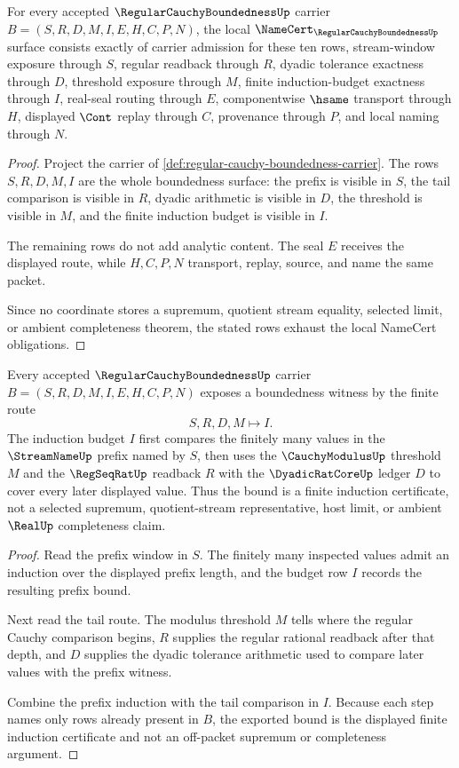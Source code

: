 \begin{theorem}
\label{thm:regular-cauchy-boundedness-namecert-obligations}
For every accepted $\RegularCauchyBoundednessUp$ carrier $B=(S,R,D,M,I,E,H,C,P,N)$, the local $\NameCert_{\RegularCauchyBoundednessUp}$ surface consists exactly of carrier admission for these ten rows, stream-window exposure through $S$, regular readback through $R$, dyadic tolerance exactness through $D$, threshold exposure through $M$, finite induction-budget exactness through $I$, real-seal routing through $E$, componentwise $\hsame$ transport through $H$, displayed $\Cont$ replay through $C$, provenance through $P$, and local naming through $N$.
\end{theorem}
\begin{proof}
Project the carrier of \autoref{def:regular-cauchy-boundedness-carrier}. The rows $S,R,D,M,I$ are the whole boundedness surface: the prefix is visible in $S$, the tail comparison is visible in $R$, dyadic arithmetic is visible in $D$, the threshold is visible in $M$, and the finite induction budget is visible in $I$.

The remaining rows do not add analytic content. The seal $E$ receives the displayed route, while $H,C,P,N$ transport, replay, source, and name the same packet.

Since no coordinate stores a supremum, quotient stream equality, selected limit, or ambient completeness theorem, the stated rows exhaust the local NameCert obligations.
\end{proof}

\begin{theorem}
\label{thm:regular-cauchy-boundedness-finite-induction-bound}
Every accepted $\RegularCauchyBoundednessUp$ carrier $B=(S,R,D,M,I,E,H,C,P,N)$ exposes a boundedness witness by the finite route
$$
S,R,D,M \longmapsto I .
$$
The induction budget $I$ first compares the finitely many values in the $\StreamNameUp$ prefix named by $S$, then uses the $\CauchyModulusUp$ threshold $M$ and the $\RegSeqRatUp$ readback $R$ with the $\DyadicRatCoreUp$ ledger $D$ to cover every later displayed value. Thus the bound is a finite induction certificate, not a selected supremum, quotient-stream representative, host limit, or ambient $\RealUp$ completeness claim.
\end{theorem}
\begin{proof}
Read the prefix window in $S$. The finitely many inspected values admit an induction over the displayed prefix length, and the budget row $I$ records the resulting prefix bound.

Next read the tail route. The modulus threshold $M$ tells where the regular Cauchy comparison begins, $R$ supplies the regular rational readback after that depth, and $D$ supplies the dyadic tolerance arithmetic used to compare later values with the prefix witness.

Combine the prefix induction with the tail comparison in $I$. Because each step names only rows already present in $B$, the exported bound is the displayed finite induction certificate and not an off-packet supremum or completeness argument.
\end{proof}

